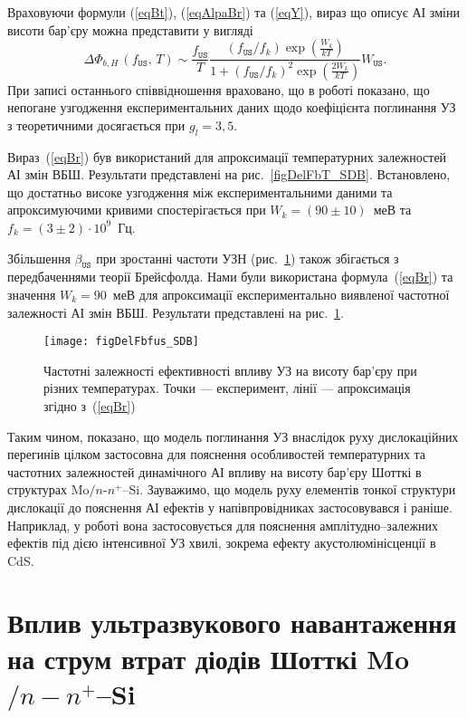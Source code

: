 Враховуючи формули (\ref{eqBt}), (\ref{eqAlpaBr}) та (\ref{eqY}),
вираз що описує АІ зміни висоти бар'єру можна представити у вигляді
\begin{equation}
\label{eqBr}
\Delta\Phi_{b,H}\,(f_\mathtt{US},\,T)\sim\frac{f_\mathtt{US}}{T}\frac{(f_\mathtt{US}/{f_k})\exp\left(\frac{W_k}{kT}\right)}
{1+(f_\mathtt{US}/{f_k})^2\exp\left(\frac{2W_k}{kT}\right)}W_\mathtt{US}.
\end{equation}
При записі останнього співвідношення враховано, що
в роботі \cite{Olikh:UPJ2014} показано, що непогане узгодження експериментальних даних щодо коефіцієнта поглинання УЗ з теоретичними
досягається при $g_l=3,5$.



Вираз~(\ref{eqBr}) був використаний для апроксимації температурних залежностей АІ змін ВБШ.
Результати представлені на рис.~\ref{figDelFbT_SDB}.
Встановлено, що достатньо високе узгодження між експериментальними даними та апроксимуючими кривими спостерігається
при  $W_k=(90\pm10)$~меВ та $f_k=(3\pm2)\cdot10^9$~Гц.

Збільшення $\beta_\mathtt{US}$ при зростанні частоти УЗН (рис.~\ref{figDelFbfus_SDB}) також збігається
з передбаченнями теорії Брейсфолда.
Нами були використана формула~(\ref{eqBr}) та значення $W_k=90$~меВ для апроксимації експериментально виявленої частотної залежності АІ змін ВБШ.
Результати представлені на рис.~\ref{figDelFbfus_SDB}.


\begin{figure}
\center
\texttt{[image: figDelFbfus\_SDB]}
\caption{\label{figDelFbfus_SDB}
Частотні залежності ефективності впливу УЗ на висоту бар'єру при різних температурах.
Точки --- експеримент,
лінії --- апроксимація згідно з~(\ref{eqBr})
}%
\end{figure}


Таким чином, показано, що модель поглинання УЗ внаслідок руху дислокаційних перегинів цілком застосовна
для пояснення особливостей температурних та частотних залежностей динамічного АІ впливу на висоту бар'єру Шотткі в структурах Mo$/n$-$n^+$--Si.
Зауважимо, що модель руху елементів тонкої структури дислокації до
пояснення АІ ефектів у напівпровідниках застосовувався і раніше.
Наприклад, у роботі \cite{Loktev} вона застосовується для пояснення амплітудно--залежних ефектів
під дією інтенсивної УЗ хвилі, зокрема ефекту акустолюмінісценції в CdS.


\section{Вплив ультразвукового навантаження на струм втрат діодів Шотткі Mo$/n-n^+$--Si\label{SSDB:Rev}}

